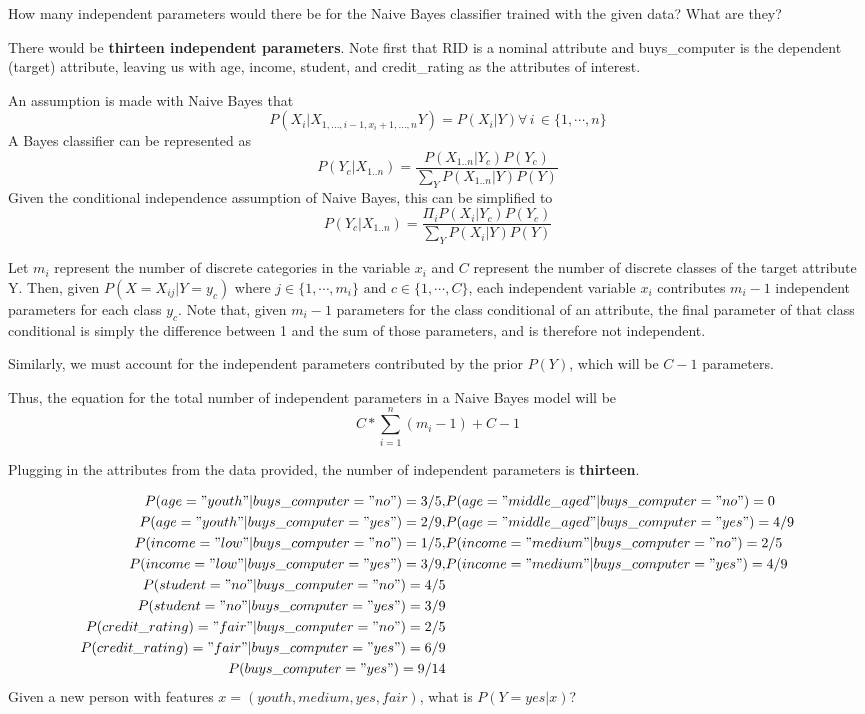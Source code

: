 \documentclass[11pt,largemargins]{homework}
\begin{document}
\begin{alphaparts}
	\questionpart How many independent parameters would there be for the Naive Bayes classifier trained with the given data? What are they?

	There would be \textbf{thirteen independent parameters}. Note first that RID is a nominal attribute and buys\_computer is the dependent (target) attribute, leaving us with age, income, student, and credit\_rating as the attributes of interest.

	An assumption is made with Naive Bayes that $$P(X_i|X_{1,\ldots,i-1, x_i+1, \ldots, n}Y)=P(X_i|Y)\forall\, i\,\in\{1, \cdots, n\}$$ 
	A Bayes classifier can be represented as
	$$P(Y_c|X_{1..n})=\frac{P(X_{1..n}|Y_c)P(Y_c)}{\sum_YP(X_{1..n}|Y)P(Y)}$$
	Given the conditional independence assumption of Naive Bayes, this can be simplified to
	$$P(Y_c|X_{1..n})=\frac{\Pi_iP(X_i|Y_c)P(Y_c)}{\sum_YP(X_i|Y)P(Y)}$$

	Let $m_i$ represent the number of discrete categories in the variable $x_i$ and $C$ represent the number of discrete classes of the target attribute Y. Then, given $P(X=X_{ij}|Y=y_c)$ where $j\in \{1, \cdots,m_i\}\text{ and }c\in\{1,\cdots,C\}$, each independent variable $x_i$ contributes $m_i-1$ independent parameters for each class $y_c$. Note that, given $m_i-1$ parameters for the class conditional of an attribute, the final parameter of that class conditional is simply the difference between 1 and the sum of those parameters, and is therefore not independent.
	
	Similarly, we must account for the independent parameters contributed by the prior $P(Y)$, which will be $C-1$ parameters.

	Thus, the equation for the total number of independent parameters in a Naive Bayes model will be
	$$C*\sum_{i=1}^n(m_i-1)+C-1$$

	Plugging in the attributes from the data provided, the number of independent parameters is \textbf{thirteen}.

	\questionpart
	{
		\tiny
		\begin{align*}
			P(age="youth"|buys\_computer="no")=3/5, &P(age="middle\_aged"|buys\_computer="no")=0\\
			P(age="youth"|buys\_computer="yes")=2/9, &P(age="middle\_aged"|buys\_computer="yes")=4/9\\
			P(income="low"|buys\_computer="no")=1/5, &P(income="medium"|buys\_computer="no")=2/5\\
			P(income="low"|buys\_computer="yes")=3/9, &P(income="medium"|buys\_computer="yes")=4/9\\
			P(student="no"|buys\_computer="no")=4/5\\
			P(student="no"|buys\_computer="yes")=3/9\\
			P(credit\_rating)="fair"|buys\_computer="no")=2/5\\
			P(credit\_rating)="fair"|buys\_computer="yes")=6/9\\
			P(buys\_computer="yes")=9/14
		\end{align*}
	}
	\questionpart Given a new person with features $x=(youth, medium, yes, fair)$, what is $P(Y=yes|x)$?


\end{alphaparts}
\end{document}

